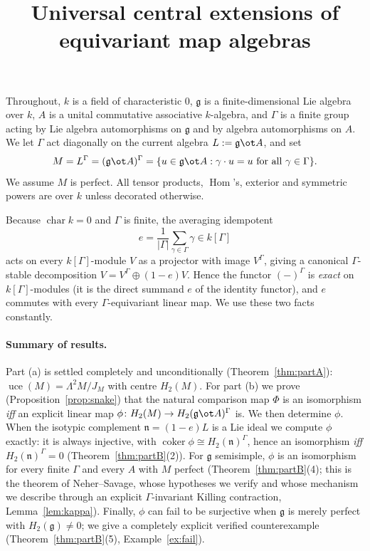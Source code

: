 \documentclass{amsart}
\theoremstyle{definition}
\DeclareMathOperator{\uce}{uce}
\DeclareMathOperator{\Hom}{Hom}
\newcommand{\g}{\mathfrak{g}}
\newcommand{\nn}{\mathfrak{n}}
\newcommand{\Gm}{\Gamma}
\begin{document}
\title{Universal central extensions of equivariant map algebras}
\maketitle

Throughout, $k$ is a field of characteristic $0$, $\g$ is a finite-dimensional
Lie algebra over $k$, $A$ is a unital commutative associative $k$-algebra, and
$\Gm$ is a finite group acting by Lie algebra automorphisms on $\g$ and by algebra
automorphisms on $A$. We let $\Gm$ act diagonally on the current algebra
$L:=\g\ot A$, and set
\[
   M=L^{\Gm}=(\g\ot A)^{\Gm}=\{u\in\g\ot A:\gamma\cdot u=u\ \text{for all }\gamma\in\Gm\}.
\]
We assume $M$ is perfect.  All tensor products, $\Hom$'s, exterior and symmetric
powers are over $k$ unless decorated otherwise.

Because $\operatorname{char}k=0$ and $\Gm$ is finite, the averaging idempotent
\[
   e=\frac{1}{|\Gm|}\sum_{\gamma\in\Gm}\gamma\in k[\Gm]
\]
acts on every $k[\Gm]$-module $V$ as a projector with image $V^{\Gm}$, giving a
canonical $\Gm$-stable decomposition $V=V^{\Gm}\oplus(1-e)V$.  Hence the functor
$(-)^{\Gm}$ is \emph{exact} on $k[\Gm]$-modules (it is the direct summand $e$ of
the identity functor), and $e$ commutes with every $\Gm$-equivariant linear map.
We use these two facts constantly.

\paragraph{Summary of results.}  Part (a) is settled completely and unconditionally
(Theorem~\ref{thm:partA}): $\uce(M)=\Lambda^2M/J_M$ with centre $H_2(M)$.  For part
(b) we prove (Proposition~\ref{prop:snake}) that the natural comparison map $\Phi$
is an isomorphism \emph{iff} an explicit linear map
$\phi\colon H_2(M)\to H_2(\g\ot A)^{\Gm}$ is.  We then determine $\phi$.  When the
isotypic complement $\nn=(1-e)L$ is a Lie ideal we compute $\phi$ exactly: it is
always injective, with $\operatorname{coker}\phi\cong H_2(\nn)^{\Gm}$, hence an
isomorphism \emph{iff} $H_2(\nn)^{\Gm}=0$ (Theorem~\ref{thm:partB}(2)).  For $\g$
semisimple, $\phi$ is an isomorphism for every finite $\Gm$ and every $A$ with $M$
perfect (Theorem~\ref{thm:partB}(4); this is the theorem of Neher--Savage, whose
hypotheses we verify and whose mechanism we describe through an explicit
$\Gm$-invariant Killing contraction, Lemma~\ref{lem:kappa}).  Finally,
$\phi$ can fail to be surjective when $\g$ is merely perfect with $H_2(\g)\ne0$;
we give a completely explicit verified counterexample (Theorem~\ref{thm:partB}(5),
Example~\ref{ex:fail}).
\end{document}
